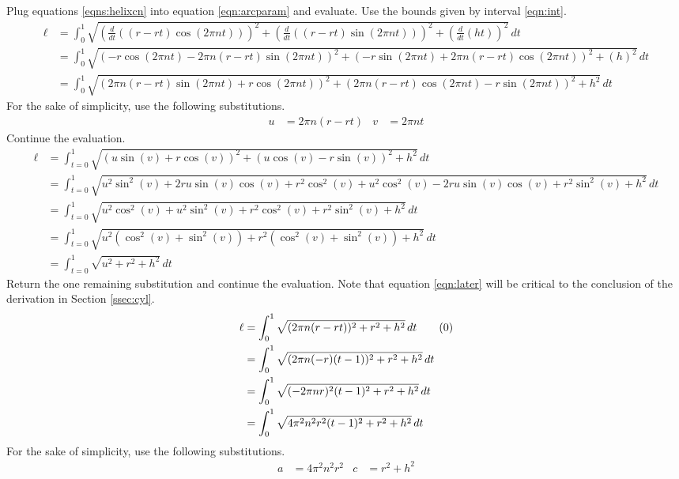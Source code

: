 \documentclass{article}
\begin{document}
\bigskip
Plug equations \ref{eqns:helixcn} into equation \ref{eqn:arcparam} and evaluate. Use the bounds given by interval \ref{eqn:int}.
\begin{align*}
    \ell &= \int_0^1\sqrt{\left(\frac{d}{dt}((r-rt)\cos(2\pi nt))\right)^2+\left(\frac{d}{dt}((r-rt)\sin(2\pi nt))\right)^2+\left(\frac{d}{dt}(ht)\right)^2}\, dt\\
    &= \int_0^1\sqrt{(-r\cos(2\pi nt)-2\pi n(r-rt)\sin(2\pi nt))^2+(-r\sin(2\pi nt)+2\pi n(r-rt)\cos(2\pi nt))^2+(h)^2}\, dt\\
    &= \int_0^1\sqrt{(2\pi n(r-rt)\sin(2\pi nt)+r\cos(2\pi nt))^2+(2\pi n(r-rt)\cos(2\pi nt)-r\sin(2\pi nt))^2+h^2}\, dt
\end{align*}
For the sake of simplicity, use the following substitutions.
\begin{align*}
    u &= 2\pi n(r-rt)&
    v &= 2\pi nt
\end{align*}
Continue the evaluation.
\begin{align*}
    \ell &= \int_{t=0}^1\sqrt{(u\sin(v)+r\cos(v))^2+(u\cos(v)-r\sin(v))^2+h^2}\, dt\\
    &= \int_{t=0}^1\sqrt{u^2\sin^2(v)+2ru\sin(v)\cos(v)+r^2\cos^2(v)+u^2\cos^2(v)-2ru\sin(v)\cos(v)+r^2\sin^2(v)+h^2}\, dt\\
    &= \int_{t=0}^1\sqrt{u^2\cos^2(v)+u^2\sin^2(v)+r^2\cos^2(v)+r^2\sin^2(v)+h^2}\, dt\\
    &= \int_{t=0}^1\sqrt{u^2\left(\cos^2(v)+\sin^2(v)\right)+r^2\left(\cos^2(v)+\sin^2(v)\right)+h^2}\, dt\\
    &= \int_{t=0}^1\sqrt{u^2+r^2+h^2}\, dt
\end{align*}
Return the one remaining substitution and continue the evaluation. Note that equation \ref{eqn:later} will be critical to the conclusion of the derivation in Section \ref{ssec:cyl}.
\begin{align*}
    \ell &= \int_0^1\sqrt{(2\pi n(r-rt))^2+r^2+h^2}\, dt\tag{\theequation}\label{eqn:later}
    \stepcounter{equation}\\
    &= \int_0^1\sqrt{(2\pi n(-r)(t-1))^2+r^2+h^2}\, dt\\
    &= \int_0^1\sqrt{(-2\pi nr)^2(t-1)^2+r^2+h^2}\, dt\\
    &= \int_0^1\sqrt{4\pi^2n^2r^2(t-1)^2+r^2+h^2}\, dt
\end{align*}
For the sake of simplicity, use the following substitutions.
\begin{align*}
    a &= 4\pi^2n^2r^2&
    c &= r^2+h^2
\end{align*}
\end{document}
